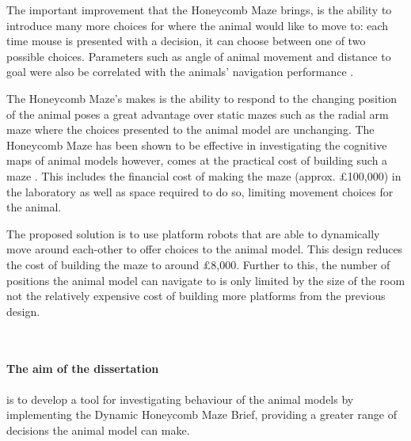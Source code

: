 The important improvement that the Honeycomb Maze brings, is the ability to introduce many more choices for where the animal would like to move to: each time mouse is presented with a decision, it can choose between one of two possible choices.  Parameters such as angle of animal movement and distance to goal were also be correlated with the animals' navigation performance \cite{nature_honeycomb_maze_paper}. 

The Honeycomb Maze's makes is the ability to respond to the changing position of the animal poses a great advantage over static mazes such as the radial arm maze where the choices presented to the animal model are unchanging.
The Honeycomb Maze has been shown to be effective in investigating the cognitive maps of animal models \cite{nature_honeycomb_maze_paper} however, comes at the practical cost of building such a maze . This includes the financial cost of making the maze (approx. £100,000) in the laboratory as well as space required to do so, limiting movement choices for the animal.

The proposed solution is to use platform robots that are able to dynamically move around each-other to offer choices to the animal model. This design reduces the cost of building the maze to around £8,000. Further to this, the number of positions the animal model can navigate to is only limited by the size of the room not the relatively expensive cost of building more platforms from the previous design.

\\

\paragraph{The aim of the dissertation} is to develop a tool for investigating behaviour of the animal models by implementing the Dynamic Honeycomb Maze Brief, providing a greater range of decisions the animal model can make.


